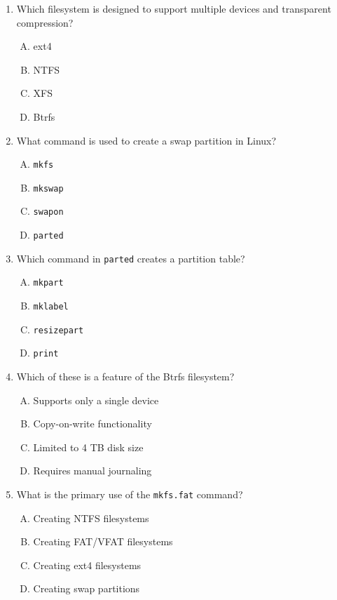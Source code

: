 \documentclass[a4paper]{report}
\begin{document}
\begin{enumerate}[1.]
    \item Which filesystem is designed to support multiple devices and transparent compression?  
    \begin{enumerate}[A)]
        \item ext4  
        \item NTFS  
        \item XFS  
        \item Btrfs  
    \end{enumerate}

    \item What command is used to create a swap partition in Linux?  
    \begin{enumerate}[A)]
        \item \texttt{mkfs}  
        \item \texttt{mkswap}  
        \item \texttt{swapon}  
        \item \texttt{parted}  
    \end{enumerate}

    \item Which command in \texttt{parted} creates a partition table?  
    \begin{enumerate}[A)]
        \item \texttt{mkpart}  
        \item \texttt{mklabel}  
        \item \texttt{resizepart}  
        \item \texttt{print}  
    \end{enumerate}

    \item Which of these is a feature of the Btrfs filesystem?  
    \begin{enumerate}[A)]
        \item Supports only a single device  
        \item Copy-on-write functionality  
        \item Limited to 4 TB disk size  
        \item Requires manual journaling  
    \end{enumerate}

    \item What is the primary use of the \texttt{mkfs.fat} command?  
    \begin{enumerate}[A)]
        \item Creating NTFS filesystems  
        \item Creating FAT/VFAT filesystems  
        \item Creating ext4 filesystems  
        \item Creating swap partitions  
    \end{enumerate}


\end{enumerate}
\end{document}
